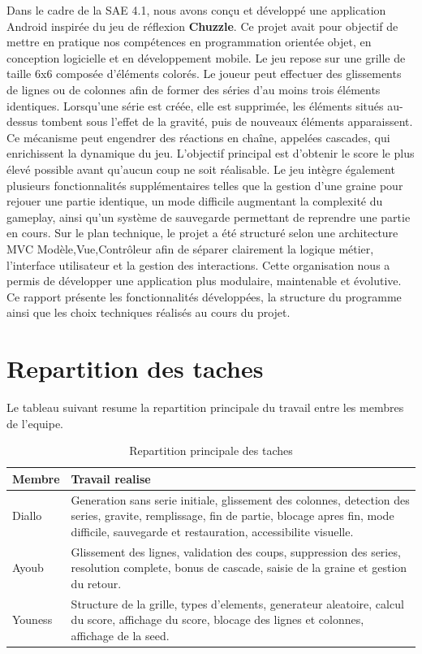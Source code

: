 \documentclass[a4paper,12pt]{article}
\begin{document}
Dans le cadre de la SAE 4.1, nous avons conçu et développé une application Android inspirée du jeu de réflexion \textbf{Chuzzle}. Ce projet avait pour objectif de mettre en pratique nos compétences en programmation orientée objet, en conception logicielle et en développement mobile.
Le jeu repose sur une grille de taille 6x6 composée d’éléments colorés. Le joueur peut effectuer des glissements de lignes ou de colonnes afin de former des séries d’au moins trois éléments identiques. Lorsqu’une série est créée, elle est supprimée, les éléments situés au-dessus tombent sous l’effet de la gravité, puis de nouveaux éléments apparaissent. Ce mécanisme peut engendrer des réactions en chaîne, appelées cascades, qui enrichissent la dynamique du jeu.
L’objectif principal est d’obtenir le score le plus élevé possible avant qu’aucun coup ne soit réalisable. Le jeu intègre également plusieurs fonctionnalités supplémentaires telles que la gestion d’une graine pour rejouer une partie identique, un mode difficile augmentant la complexité du gameplay, ainsi qu’un système de sauvegarde permettant de reprendre une partie en cours.
Sur le plan technique, le projet a été structuré selon une architecture MVC Modèle,Vue,Contrôleur afin de séparer clairement la logique métier, l’interface utilisateur et la gestion des interactions. Cette organisation nous a permis de développer une application plus modulaire, maintenable et évolutive.
Ce rapport présente les fonctionnalités développées, la structure du programme ainsi que les choix techniques réalisés au cours du projet.

\section{Repartition des taches}
Le tableau suivant resume la repartition principale du travail entre les membres de l'equipe.

\begin{table}[H]
    \centering
    \begin{tabular}{|>{\raggedright\arraybackslash}p{3cm}|>{\raggedright\arraybackslash}p{11cm}|}
        \hline
        \textbf{Membre} & \textbf{Travail realise} \\
        \hline
        Diallo & Generation sans serie initiale, glissement des colonnes, detection des series, gravite, remplissage, fin de partie, blocage apres fin, mode difficile, sauvegarde et restauration, accessibilite visuelle. \\
        \hline
        Ayoub & Glissement des lignes, validation des coups, suppression des series, resolution complete, bonus de cascade, saisie de la graine et gestion du retour. \\
        \hline
        Youness & Structure de la grille, types d'elements, generateur aleatoire, calcul du score, affichage du score, blocage des lignes et colonnes, affichage de la seed. \\
        \hline
    \end{tabular}
    \caption{Repartition principale des taches}
\end{table}
\end{document}
